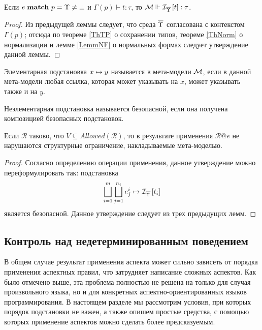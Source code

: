 \begin{Lemm}
Если $e \; \mathbf{match}_{} \; p = \Upsilon \neq \bot$ и $\Gamma(p) \vdash t : \tau$, то $\mathcal{M} \Vdash \mathcal{I}_{\overline{\Upsilon}} \left[ t \right] : \tau$.
\end{Lemm}
\begin{proof}
Из предыдущей леммы следует, что среда $\overline{\Upsilon}$ согласована с контекстом $\Gamma(p)$; отсюда по теореме \ref{ThTP} о сохранении типов, теореме \ref{ThNorm} о нормализации и лемме \ref{LemmNF} о нормальных формах следует утверждение данной леммы.
\end{proof}

\begin{Def}
Элементарная подстановка $x \mapsto y$ называется  в мета-модели $\mathcal{M}$, если в данной мета-модели любая ссылка, которая может указывать на $x$, может указывать также и на $y$.

Неэлементарная подстановка называется безопасной, если она получена композицией безопасных подстановок.
\end{Def}

\begin{Th}
Если $\mathcal{R}$ таково, что $V \subseteq Allowed(\mathcal{R})$, то в результате применения $\mathcal{R}@e$ не нарушаются структурные ограничение, накладываемые мета-моделью.
\end{Th}
\begin{proof}
Согласно определению операции применения, данное утверждение можно переформулировать так: подстановка
$$
\bigsqcup\limits_{i=1}^{m} \bigsqcup\limits_{j=1}^{n_i}
			e^i_j \mapsto \mathcal{I}_{\overline{\Upsilon}} \left[ t_i \right]
$$
является безопасной. Данное утверждение следует из трех предыдущих лемм.
\end{proof}

\subsection{Контроль над недетерминированным поведением}

В общем случае результат применения аспекта может сильно зависеть от порядка применения аспектных правил, что затрудняет написание сложных аспектов. Как было отмечено выше, эта проблема полностью не решена на только для случая произвольного языка, но и для конкретных аспектно-ориентированных языков программирования. В настоящем разделе мы рассмотрим условия, при которых порядок подстановки не важен, а также опишем простые средства, с помощью которых применение аспектов можно сделать более предсказуемым.

